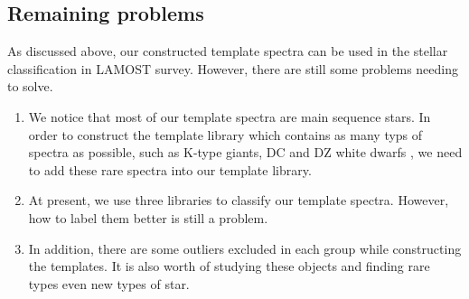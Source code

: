 \documentclass[manuscript]{aastex}
\begin{document}
%
%
%




\subsection{Remaining problems}
As discussed above, our constructed template spectra can be used in the stellar classification in LAMOST survey.
However, there are still some problems needing to solve.
\begin{enumerate}
\item
We notice that most of our template spectra are main sequence stars.
In order to construct the template library which contains as many typs of spectra as possible,
such as  K-type giants, DC and DZ white dwarfs \citep{si2013search},
we need to add these rare spectra into our template library.
\item
At present, we use  three libraries to classify our template spectra.
However, how to label them better is still a  problem.

\item
In addition, there are some outliers excluded in each group while constructing the templates.
It is also worth of studying these objects and finding rare types even new types of star.
\end{enumerate}
\end{document}
